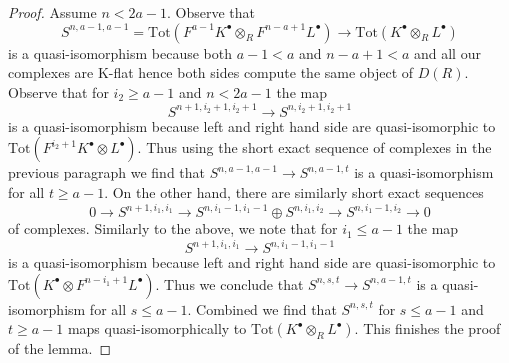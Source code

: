 \documentclass[10pt,a4paper]{amsart}
\theoremstyle{plain}
\theoremstyle{definition}
\theoremstyle{remark}
\numberwithin{equation}{subsection}
\begin{document}
\begin{proof}
\medskip\noindent
Assume $n < 2a - 1$. Observe that
$$
S^{n, a - 1, a - 1} =
\text{Tot}(F^{a - 1}K^\bullet \otimes_R F^{n - a + 1}L^\bullet)
\to \text{Tot}(K^\bullet \otimes_R L^\bullet)
$$
is a quasi-isomorphism because both $a - 1 < a$ and $n - a + 1 < a$
and all our complexes are K-flat hence both sides compute the
same object of $D(R)$.
Observe that for $i_2 \geq a - 1$ and $n < 2a - 1$ the map
$$
S^{n + 1, i_2 + 1, i_2 + 1} \to S^{n, i_2 + 1, i_2 + 1}
$$
is a quasi-isomorphism because left and right hand side are quasi-isomorphic
to $\text{Tot}(F^{i_2 + 1}K^\bullet \otimes L^\bullet)$.
Thus using the short exact
sequence of complexes in the previous paragraph we find that
$S^{n, a - 1, a - 1} \to S^{n, a - 1, t}$ is a quasi-isomorphism for
all $t \geq a - 1$. On the other hand, there are similarly short
exact sequences
$$
0 \to
S^{n + 1, i_1, i_1}
\to
S^{n, i_1 - 1, i_1 - 1} \oplus
S^{n, i_1, i_2}
\to
S^{n, i_1 - 1, i_2}
\to
0
$$
of complexes. Similarly to the above, we note that for $i_1 \leq a - 1$
the map
$$
S^{n + 1, i_1, i_1} \to S^{n, i_1 - 1, i_1 - 1}
$$
is a quasi-isomorphism because left and right hand side are quasi-isomorphic
to $\text{Tot}(K^\bullet \otimes F^{n - i_1 + 1}L^\bullet)$.
Thus we conclude that $S^{n, s, t} \to S^{n, a - 1, t}$ is a quasi-isomorphism
for all $s \leq a - 1$. Combined we find that $S^{n, s, t}$ for $s \leq a - 1$
and $t \geq a - 1$ maps quasi-isomorphically to
$\text{Tot}(K^\bullet \otimes_R L^\bullet)$.
This finishes the proof of the lemma.
\end{proof}
\end{document}
